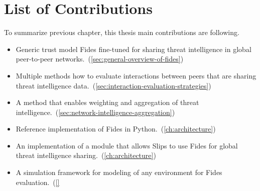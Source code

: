 \section{List of Contributions}
\label{sec:list-of-contributions}
\noindent
To summarize previous chapter, this thesis main contributions are following.
\begin{itemize}
    \item Generic trust model Fides fine-tuned for sharing threat intelligence in global peer-to-peer networks.~(\ref{sec:general-overview-of-fides})
    \item Multiple methods how to evaluate interactions between peers that are sharing threat intelligence data.~(\ref{sec:interaction-evaluation-strategies})
    \item A method that enables weighting and aggregation of threat intelligence.~(\ref{sec:network-intelligence-aggregation})
    \item Reference implementation of Fides in Python.~(\ref{ch:architecture})
    \item An implementation of a module that allows Slips to use Fides for global threat intelligence sharing.~(\ref{ch:architecture})
    \item A simulation framework for modeling of any environment for Fides evaluation.~(\ref{}
\end{itemize}